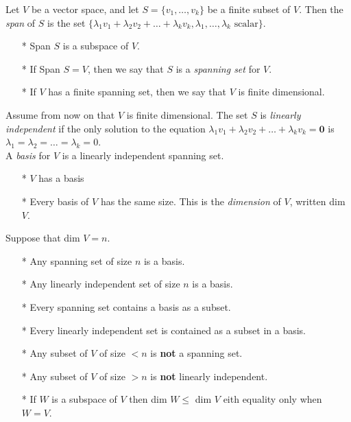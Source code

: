 \documentclass[10pt]{scrartcl}
\begin{document}

\setcounter{lecture}{1}
\pagebreak
{}
\setcounter{page}{3}

Let   $V$ be a vector space, and let $S = \{v_1, \dots, v_k\}$ be a finite subset of $V$. Then the \emph{span} of $S$ is the set $\{\lambda_1v_1 + \lambda_2v_2 + \dots + \lambda_kv_k, \lambda_1,\dots,\lambda_k \text{ scalar}\}.$

\begin{itemize}
\item[*] Span $S$ is a subspace of $V$.
\item[*] If Span $S = V$, then we say that $S$ is a \emph{spanning set} for $V$. 
\item[*] If $V$ has a finite spanning set, then we say that $V$ is finite dimensional.
\end{itemize}


Assume from now on that $V$ is finite dimensional. The set $S$ is \emph{linearly independent} if the only solution to the equation $\lambda_1v_1 + \lambda_2v_2 + \dots + \lambda_kv_k = \mathbf{0}$ is $\lambda_1 = \lambda_2 = \dots = \lambda_k = 0.$\\

A \emph{basis} for $V$ is a linearly independent spanning set.

\begin{itemize}
\item[*] $V$ has a basis
\item[*] Every basis of $V$ has the same size. This is the \emph{dimension} of $V$, written dim $V$. 
\end{itemize}

Suppose that dim $V = n$.
\begin{itemize}
\item[*] Any spanning set of size $n$ is a basis. 
\item[*] Any linearly independent set of size $n$ is a basis.
\item[*] Every spanning set contains a basis as a subset.
\item[*] Every linearly independent set is contained as a subset in a basis.
\item[*] Any subset of $V$ of size $< n$ is \textbf{not} a spanning set.
\item[*] Any subset of $V$ of size $>n$ is \textbf{not} linearly independent. 
\item[*] If $W$ is a subspace of $V$ then dim $W \leq $ dim $V$ eith equality only when $W = V$. 
\end{itemize}\vspace*{5pt}
\end{document}
